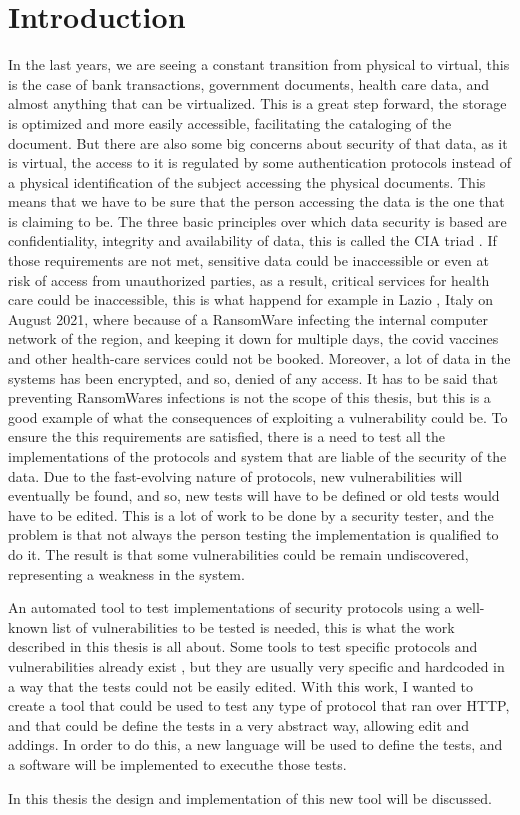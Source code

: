 \chapter{Introduction}
In the last years, we are seeing a constant transition from physical to virtual, this is the case of bank transactions, government documents, health care data, and almost anything that can be virtualized. This is a great step forward, the storage is optimized and more easily accessible, facilitating the cataloging of the document. But there are also some big concerns about security of that data, as it is virtual, the access to it is regulated by some authentication protocols instead of a physical identification of the subject accessing the physical documents. This means that we have to be sure that the person accessing the data is the one that is claiming to be. The three basic principles over which data security is based are confidentiality, integrity and availability of data, this is called the CIA triad \cite{cia_triad}.
If those requirements are not met, sensitive data could be inaccessible or even at risk of access from unauthorized parties, as a result, critical services for health care could be inaccessible, this is what happend for example in Lazio \cite{lazio_hacker_0} \cite{lazio_hacker_1}, Italy on August 2021, where because of a RansomWare infecting the internal computer network of the region, and keeping it down for multiple days, the covid vaccines and other health-care services could not be booked. Moreover, a lot of data in the systems has been encrypted, and so, denied of any access. It has to be said that preventing RansomWares infections is not the scope of this thesis, but this is a good example of what the consequences of exploiting a vulnerability could be.
To ensure the this requirements are satisfied, there is a need to test all the implementations of the protocols and system that are liable of the security of the data. Due to the fast-evolving nature of protocols, new vulnerabilities will eventually be found, and so, new tests will have to be defined or old tests would have to be edited. This is a lot of work to be done by a security tester, and the problem is that not always the person testing the implementation is qualified to do it. The result is that some vulnerabilities could be remain undiscovered, representing a weakness in the system.

An automated tool to test implementations of security protocols using a well-known list of vulnerabilities to be tested is needed, this is what the work described in this thesis is all about. Some tools to test specific protocols and vulnerabilities already exist \cite{wendy_barreto}\cite{claudio_grisenti}, but they are usually very specific and hardcoded in a way that the tests could not be easily edited. With this work, I wanted to create a tool that could be used to test any type of protocol that ran over HTTP, and that could be define the tests in a very abstract way, allowing edit and addings. In order to do this, a new language will be used to define the tests, and a software will be implemented to executhe those tests.

In this thesis the design and implementation of this new tool will be discussed.



